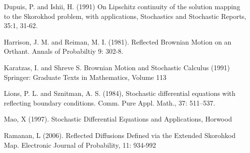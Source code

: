 \documentclass[]{article}
\theoremstyle{definition}
\theoremstyle{assumption}
\theoremstyle{remark}
\begin{document}
\begin{thebibliography}{9}

Dupuis, P. and Ishii, H. (1991) On Lipschitz continuity of the solution
mapping to the Skorokhod problem, with applications, Stochastics and Stochastic Reports,
35:1, 31-62.

Harrison, J. M. and Reiman, M. I. (1981). Reflected Brownian Motion on an Orthant. Annals of Probabiltiy 9: 302-8.

Karatzas, I. and Shreve S. Brownian Motion and Stochastic Calculus (1991) Springer: Graduate Texts in Mathematics, Volume 113

 Lions, P. L. and Sznitman, A. S. (1984), Stochastic differential equations with reflecting boundary conditions. Comm. Pure Appl. Math., 37: 511–537.

Mao, X (1997). Stochastic Differential Equations and Applications, Horwood

Ramanan, L (2006). Reflected Diffusions Defined via the Extended Skorohkod Map. Electronic Journal of Probability, 11: 934-992

\end{thebibliography}
\end{document}
